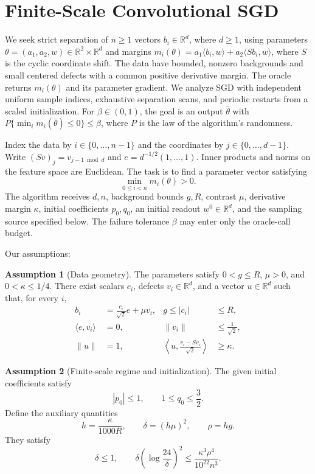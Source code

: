 \documentclass[10pt]{article}
\theoremstyle{definition}
\newtheorem{assumption}{Assumption}
\begin{document}
\section*{Finite-Scale Convolutional SGD}
We seek strict separation of $n\geq1$ vectors $b_i\in\mathbb{R}^d$, where $d\geq1$, using parameters $\theta=(a_1,a_2,w)\in\mathbb{R}^2\times\mathbb{R}^d$ and margins $m_i(\theta)=a_1\langle b_i,w\rangle+a_2\langle Sb_i,w\rangle$, where $S$ is the cyclic coordinate shift. The data have bounded, nonzero backgrounds and small centered defects with a common positive derivative margin. The oracle returns $m_i(\theta)$ and its parameter gradient. We analyze SGD with independent uniform sample indices, exhaustive separation scans, and periodic restarts from a scaled initialization. For $\beta\in(0,1)$, the goal is an output $\bar\theta$ with $P\{\min_i m_i(\bar\theta)\leq0\}\leq\beta$, where $P$ is the law of the algorithm's randomness.

Index the data by $i\in\{0,\ldots,n-1\}$ and the coordinates by $j\in\{0,\ldots,d-1\}$. Write $(Sv)_j=v_{j-1\bmod d}$ and $e=d^{-1/2}(1,\ldots,1)$. Inner products and norms on the feature space are Euclidean. The task is to find a parameter vector satisfying
\[
\min_{0\leq i<n}m_i(\theta)>0.
\]
The algorithm receives $d,n$, background bounds $g,R$, contrast $\mu$, derivative margin $\kappa$, initial coefficients $p_0,q_0$, an initial readout $w^0\in\mathbb{R}^d$, and the sampling source specified below. The failure tolerance $\beta$ may enter only the oracle-call budget.

Our assumptions:
\begin{assumption}[Data geometry]
The parameters satisfy $0<g\leq R$, $\mu>0$, and $0<\kappa\leq1/4$. There exist scalars $c_i$, defects $v_i\in\mathbb{R}^d$, and a vector $u\in\mathbb{R}^d$ such that, for every $i$,
\[
\begin{aligned}
b_i&=\frac{c_i}{\sqrt{2}}e+\mu v_i,
&g\leq |c_i|&\leq R,\\
\langle e,v_i\rangle&=0,
&\|v_i\|&\leq\frac{1}{\sqrt{2}},\\
\|u\|&=1,
&\left\langle u,\frac{v_i-Sv_i}{\sqrt{2}}\right\rangle&\geq\kappa.
\end{aligned}
\]
\end{assumption}

\begin{assumption}[Finite-scale regime and initialization]
The given initial coefficients satisfy
\[
|p_0|\leq1,\qquad 1\leq q_0\leq\frac32.
\]
Define the auxiliary quantities
\[
h=\frac{\kappa}{1000R},\qquad
\delta=(h\mu)^2,\qquad \rho=hg.
\]
They satisfy
\[
\delta\leq1,\qquad
\delta\left(\log\frac{24}{\delta}\right)^2
\leq\frac{\kappa^3\rho^4}{10^{22}n^3}.
\]
\end{assumption}
\end{document}
